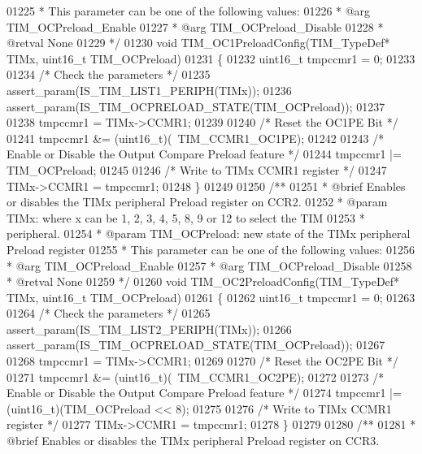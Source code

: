 \begin{DoxyCode}
01225 \textcolor{comment}{  *          This parameter can be one of the following values:}
01226 \textcolor{comment}{  *            @arg TIM\_OCPreload\_Enable}
01227 \textcolor{comment}{  *            @arg TIM\_OCPreload\_Disable}
01228 \textcolor{comment}{  * @retval None}
01229 \textcolor{comment}{  */}
01230 \textcolor{keywordtype}{void} TIM_OC1PreloadConfig(TIM\_TypeDef* TIMx, uint16\_t TIM\_OCPreload)
01231 \{
01232   uint16\_t tmpccmr1 = 0;
01233 
01234   \textcolor{comment}{/* Check the parameters */}
01235   assert_param(IS\_TIM\_LIST1\_PERIPH(TIMx));
01236   assert_param(IS\_TIM\_OCPRELOAD\_STATE(TIM\_OCPreload));
01237 
01238   tmpccmr1 = TIMx->CCMR1;
01239 
01240   \textcolor{comment}{/* Reset the OC1PE Bit */}
01241   tmpccmr1 &= (uint16\_t)(~TIM_CCMR1_OC1PE);
01242 
01243   \textcolor{comment}{/* Enable or Disable the Output Compare Preload feature */}
01244   tmpccmr1 |= TIM\_OCPreload;
01245 
01246   \textcolor{comment}{/* Write to TIMx CCMR1 register */}
01247   TIMx->CCMR1 = tmpccmr1;
01248 \}
01249 
01250 \textcolor{comment}{/**}
01251 \textcolor{comment}{  * @brief  Enables or disables the TIMx peripheral Preload register on CCR2.}
01252 \textcolor{comment}{  * @param  TIMx: where x can be  1, 2, 3, 4, 5, 8, 9 or 12 to select the TIM }
01253 \textcolor{comment}{  *         peripheral.}
01254 \textcolor{comment}{  * @param  TIM\_OCPreload: new state of the TIMx peripheral Preload register}
01255 \textcolor{comment}{  *          This parameter can be one of the following values:}
01256 \textcolor{comment}{  *            @arg TIM\_OCPreload\_Enable}
01257 \textcolor{comment}{  *            @arg TIM\_OCPreload\_Disable}
01258 \textcolor{comment}{  * @retval None}
01259 \textcolor{comment}{  */}
01260 \textcolor{keywordtype}{void} TIM_OC2PreloadConfig(TIM\_TypeDef* TIMx, uint16\_t TIM\_OCPreload)
01261 \{
01262   uint16\_t tmpccmr1 = 0;
01263 
01264   \textcolor{comment}{/* Check the parameters */}
01265   assert_param(IS\_TIM\_LIST2\_PERIPH(TIMx));
01266   assert_param(IS\_TIM\_OCPRELOAD\_STATE(TIM\_OCPreload));
01267 
01268   tmpccmr1 = TIMx->CCMR1;
01269 
01270   \textcolor{comment}{/* Reset the OC2PE Bit */}
01271   tmpccmr1 &= (uint16\_t)(~TIM_CCMR1_OC2PE);
01272 
01273   \textcolor{comment}{/* Enable or Disable the Output Compare Preload feature */}
01274   tmpccmr1 |= (uint16\_t)(TIM\_OCPreload << 8);
01275 
01276   \textcolor{comment}{/* Write to TIMx CCMR1 register */}
01277   TIMx->CCMR1 = tmpccmr1;
01278 \}
01279 
01280 \textcolor{comment}{/**}
01281 \textcolor{comment}{  * @brief  Enables or disables the TIMx peripheral Preload register on CCR3.}

\end{DoxyCode}
